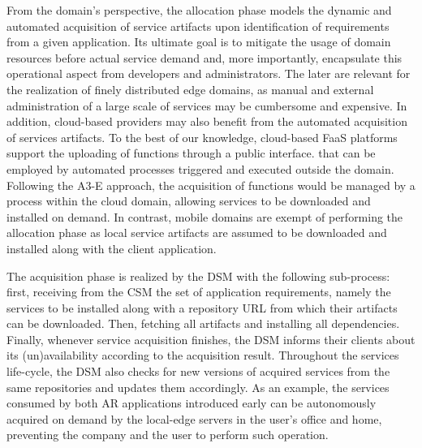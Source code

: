 From the domain's perspective, the allocation phase models the dynamic and automated acquisition of service artifacts upon identification of requirements from a given application. Its ultimate goal is to mitigate the usage of domain resources before actual service demand and, more importantly, encapsulate this operational aspect from developers and administrators. The later are relevant for the realization of finely distributed edge domains, 
as manual and external administration of a large scale of services may be cumbersome and expensive. In addition, cloud-based providers may also benefit from the automated acquisition of services artifacts. To the best of our knowledge,
cloud-based FaaS platforms support the uploading of functions through a public interface. that can be employed by automated processes triggered and executed outside the domain. Following the A3-E approach, the acquisition of functions would be managed by a process within the cloud domain, allowing services to be downloaded and installed on demand. In contrast, mobile domains are exempt of performing the allocation phase as local service artifacts are assumed to be downloaded and installed along with the client application.


The acquisition phase is realized by the DSM with the following sub-process: first, receiving from the CSM the set of application requirements, namely the services to be installed along with a repository URL from which their artifacts can be downloaded. Then, fetching all artifacts and installing all dependencies. Finally, whenever service acquisition finishes, the DSM informs their clients about its (un)availability according to the acquisition result. Throughout the services life-cycle, the DSM also checks for new versions of acquired services from the same repositories and updates them accordingly. As an example, the services consumed by both AR applications introduced early can be autonomously acquired on demand by the local-edge servers in the user's office and home, preventing the company and the user to perform such operation. 

